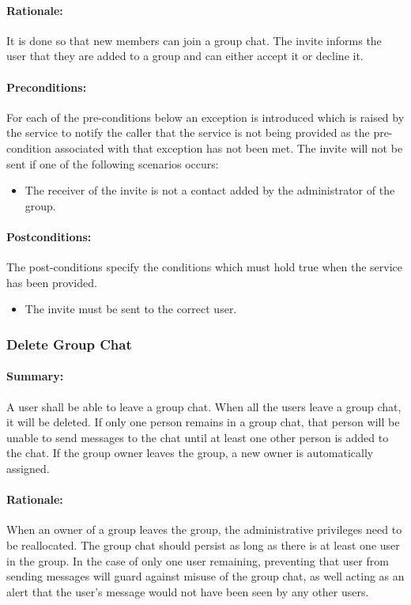 \documentclass[11pt]{article}
\begin{document}
\paragraph{Rationale:} It is done so that new members can join a group chat. The invite informs the user that they are added to a group and can either accept it or decline it.
\paragraph{Preconditions:}
 For each of the pre-conditions below an exception is introduced which is raised by the service to notify the caller that the service is not being provided as the pre-condition associated with that exception has not been met.\newline
 The invite will not be sent if one of the following scenarios occurs:
 \begin{itemize}
 \item	The receiver of the invite is not a contact added by the administrator of the group.
 \end{itemize}
\paragraph{Postconditions:}
The post-conditions specify the conditions which must hold true when the service has been provided.
 \begin{itemize}
\item	The invite must be sent to the correct user.
\end{itemize}

\subsubsection{Delete Group Chat} \label{UC-delete-group}
\paragraph{Summary:}A user shall be able to leave a group chat. When all the users leave a group chat, it will be deleted. If only one person remains in a group chat, that person will be unable to send messages to the chat until at least one other person is added to the chat. If the group owner leaves the group, a new owner is automatically assigned.
\paragraph{Rationale:}When an owner of a group leaves the group, the administrative privileges need to be reallocated. The group chat should persist as long as there is at least one user in the group. In the case of only one user remaining, preventing that user from sending messages will guard against misuse of the group chat, as well acting as an alert that the user's message would not have been seen by any other users.
\end{document}
